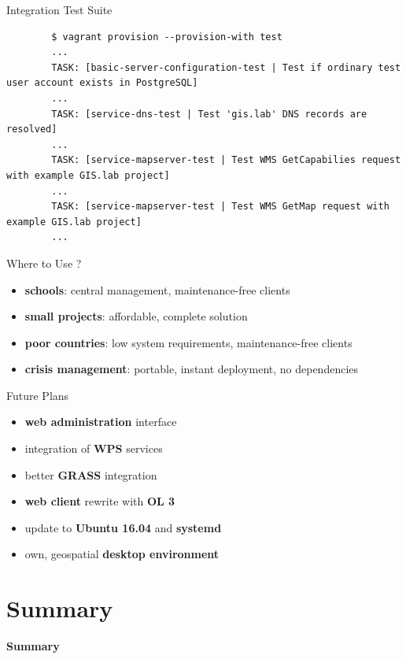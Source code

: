 \documentclass[12pt]{beamer}
\begin{document}
\begin{frame}[fragile]{Integration Test Suite}
	\lstset{language=sh}
	\begin{lstlisting}
		$ vagrant provision --provision-with test
		...
		TASK: [basic-server-configuration-test | Test if ordinary test user account exists in PostgreSQL]
		...
		TASK: [service-dns-test | Test 'gis.lab' DNS records are resolved]
		...
		TASK: [service-mapserver-test | Test WMS GetCapabilies request with example GIS.lab project]
		...
		TASK: [service-mapserver-test | Test WMS GetMap request with example GIS.lab project]
		...
	\end{lstlisting}
\end{frame}

\begin{frame}{Where to Use ?}
	\begin{itemize}
		\item \textbf{schools}: central management, maintenance-free clients
		\item \textbf{small projects}: affordable, complete solution
		\item \textbf{poor countries}: low system requirements, maintenance-free clients
		\item \textbf{crisis management}: portable, instant deployment, no dependencies
	\end{itemize}
\end{frame}

\begin{frame}{Future Plans}
	\begin{itemize}
		\item \textbf{web administration} interface
		\item integration of \textbf{WPS} services
		\item better \textbf{GRASS} integration
		\item \textbf{web client} rewrite with \textbf{OL 3}
		\item update to \textbf{Ubuntu 16.04} and \textbf{systemd}
		\item own, geospatial \textbf{desktop environment}
	\end{itemize}
\end{frame}


\section{Summary}
\begin{frame}
	\begin{center}
		\LARGE\textbf{Summary}
	\end{center}
\end{frame}
\end{document}
